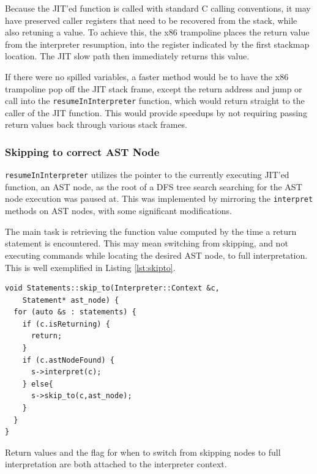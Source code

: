 \documentclass[journal,comsoc]{IEEEtran}
\begin{document}
		Because the JIT'ed function is called with standard C calling conventions, it may have preserved caller registers that need to be recovered from the stack, while also retuning a value. To achieve this, the x86 trampoline places the return value from the interpreter resumption, into the register indicated by the first stackmap location. The JIT slow path then immediately returns this value.
		
		If there were no spilled variables, a faster method would be to have the x86 trampoline pop off the JIT stack frame, except the return address and jump or call into the \lstinline|resumeInInterpreter| function, which would return straight to the caller of the JIT function. This would provide speedups by not requiring passing return values back through various stack frames.
	
	\subsubsection{Skipping to correct AST Node}
		\lstinline|resumeInInterpreter| utilizes the pointer to the currently executing JIT'ed function, an AST node, as the root of a DFS tree search searching for the AST node execution was paused at. This was implemented by mirroring the \lstinline|interpret| methods on AST nodes, with some significant modifications. 
		
		The main task is retrieving the function value computed by the time a return statement is encountered. This may mean switching from skipping, and not executing commands while locating the desired AST node, to full interpretation. This is well exemplified in Listing \ref{lst:skipto}.
		
\begin{lstlisting}[caption={The skip\_to method on a block of Statements}, label={lst:skipto},basicstyle=\footnotesize]
void Statements::skip_to(Interpreter::Context &c, 
	Statement* ast_node) {                                          
  for (auto &s : statements) {                                                                                  
    if (c.isReturning) {                                                                                      
      return;  
    }            
    if (c.astNodeFound) {                                                                                     
      s->interpret(c);  
    } else{
      s->skip_to(c,ast_node);    
    } 
  }     
}    
\end{lstlisting}
	
	Return values and the flag for when to switch from skipping nodes to full interpretation are both attached to the interpreter context.
	
\end{document}
